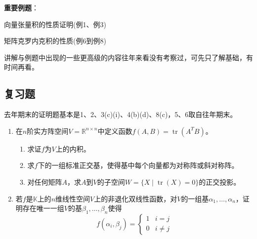 \documentclass[a4paper,UTF8,fontset=windows,AutoFakeBold]{ctexart}
\DeclareMathOperator{\tr}{tr}
\newcommand*{\note}{\noindent *}
\begin{document}
\begin{enumerate}
    \textbf{重要例题}：
    \begin{compactitem}
        \item 向量张量积的性质证明(例1、例3)
        \item 矩阵克罗内克积的性质(例6到例8)
    \end{compactitem}
    \note 讲解与例题中出现的一些更高级的内容往年来看没有考察过，可先只了解基础，有时间再看。
\end{enumerate}

\subsection{复习题}
去年期末的证明题基本是1、2、3(c)(i)、4(b)(d)、8(c)，5、6取自往年期末。
\begin{enumerate}
    \item 在$n$阶实方阵空间$V=\mathbb{R}^{n\times n}$中定义函数$f(A,B)=\tr(A^TB)$。
    \begin{enumerate}
        \item 求证$f$为$V$上的内积。
        \item 求$f$下的一组标准正交基，使得基中每个向量都为对称阵或斜对称阵。
        \item 对任何矩阵$A$，求$A$到$V$的子空间$W=\{X\mid\tr(X)=0\}$的正交投影。
    \end{enumerate}

    \item
    若$f$是$\mathbb{K}$上的$n$维线性空间$V$上的非退化双线性函数，对$V$的一组基$\alpha_1,\dots,\alpha_n$，证明存在唯一一组$V$的基$\beta_1,\dots,\beta_n$使得
    $$f(\alpha_i,\beta_j)=\begin{cases}1&i=j\\0&i\ne j\end{cases}$$
    

\end{enumerate}
\end{document}
